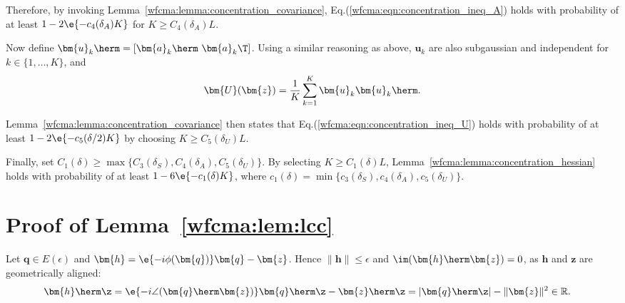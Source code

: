 Therefore, by invoking Lemma~\ref{wfcma:lemma:concentration_covariance},   Eq.(\ref{wfcma:eqn:concentration_ineq_A}) holds with probability of at least $1-2\e{-c_4(\delta_A)K}$ for $K\geq C_4(\delta_A)L$.

Now define $\bm{u}_k\herm=[\bm{a}_k\herm\,\,\bm{a}_k\T ]$. Using a similar reasoning as above, $\bm{u}_k$ are also subgaussian and independent for $k\in\{1,\ldots,K\}$, and 
\begin{align}
	\bm{U}(\bm{z})= \frac{1}{K}\sum_{k=1}^K\bm{u}_k\bm{u}_k\herm. \nonumber
\end{align}

Lemma~\ref{wfcma:lemma:concentration_covariance} then states that Eq.(\ref{wfcma:eqn:concentration_ineq_U}) holds with probability of at least $1-2\e{-c_5(\delta/2)K}$ by choosing $K\geq C_5(\delta_U)L$.

Finally, set $C_1(\delta)\geq\max\{C_3(\delta_S),C_4(\delta_A),C_5(\delta_U)\}$. By selecting $K\geq C_1(\delta)L$, Lemma~\ref{wfcma:lemma:concentration_hessian} holds with probability of at least $1-6\e{-c_1(\delta)K}$, where $c_1(\delta)=\min\{c_3(\delta_S),c_4(\delta_A),c_5(\delta_U)\}$.

\section{Proof of Lemma~\ref{wfcma:lem:lcc}}\label{wfcma:appdx:llc}
Let $\bm{q}\in E(\epsilon)$ and $\bm{h}=\e{-i\phi(\bm{q})}\bm{q}-\bm{z}$. Hence $\|\bm{h}\|\leq\epsilon$ and $\im(\bm{h}\herm\bm{z})=0$, as $\bm{h}$ and $\bm{z}$ are geometrically aligned:
\begin{align}
	\bm{h}\herm\z&=\e{-i\angle(\bm{q}\herm\bm{z})}\bm{q}\herm\z-\bm{z}\herm\z %
	=|\bm{q}\herm\z|-\|\bm{z}\|^2\in\mathbb{R}.
\end{align}

